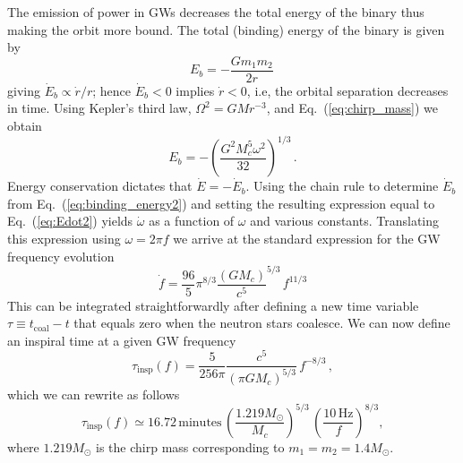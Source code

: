\documentclass[prd,amsmath,amssymb,aps,floats,amsfonts,notitlepage,superscriptaddress,eqsecnum,nofootinbib,10pt]{revtex4-1}
\newcommand{\f}{\frac}
\newcommand{\be}{\begin{equation}}
\newcommand{\ee}{\end{equation}}
\begin{document}
The emission of power in GWs decreases the total energy of the binary thus making the orbit more bound. 
The total (binding) energy of the binary is given by
%
\be
E_b = -\frac{G m_1 m_2}{2r}\,  \label{eq:binding_energy1}
\ee
%
giving $\dot{E}_b \propto \dot{r}/r$; hence $\dot{E}_b < 0$ implies $\dot{r}<0$, i.e, the orbital separation decreases in time.
Using Kepler's third law, $ \Omega^2 = G M r^{-3}$, and Eq.~(\ref{eq:chirp_mass}) we obtain
%
\be
E_b = -\left(\f{G^2 M_c^5 \omega^2}{32}\right)^{1/3}\, . \label{eq:binding_energy2}
\ee
%
Energy conservation dictates that $\dot{E}=-\dot{E}_b$. Using the chain rule to determine $\dot{E}_b$ from Eq.~(\ref{eq:binding_energy2})
and setting the resulting expression equal to Eq.~(\ref{eq:Edot2}) yields $\dot{\omega}$ as a function of $\omega$ and various constants.
Translating this expression using $\omega=2\pi f$ we arrive at the standard expression for the GW frequency evolution
%
\be
\dot{f} = \f{96}{5}\pi^{8/3} \f{(G M_c)}{c^5}^{5/3}\, f^{11/3} \label{eq:fdot}
\ee
%
This can be integrated straightforwardly after defining a new time variable $\tau\equiv t_\text{coal}-t$ that equals zero when the neutron stars coalesce.
We can now define an inspiral time at a given GW frequency
%
\be
\tau_\text{insp}(f) = \f{5}{256\pi}\f{c^5}{(\pi G M_c)^{5/3}} \,f^{-8/3}\label{eq:tau_insp}\, ,
\ee
%
%
%
which we can rewrite as follows
%
\be
\tau_\text{insp}(f) \simeq 16.72\,\text{minutes} \, \left(\f{1.219 M_\odot}{M_c}\right)^{5/3}\,\left(\f{10\,\text{Hz}}{f}\right)^{8/3}, \label{eq:tau_insp2}
\ee
%
where $1.219 M_\odot$ is the chirp mass corresponding to $m_1=m_2=1.4 M_\odot$.
\end{document}
